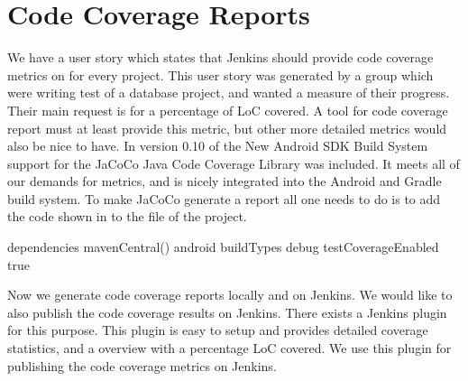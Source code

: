 \section{Code Coverage Reports}

We have a user story which states that Jenkins should provide code coverage metrics on for every project. This user story was generated by a group which were writing test of a database project, and wanted a measure of their progress. Their main request is for a percentage of LoC covered. A tool for code coverage report must at least provide this metric, but other more detailed metrics would also be nice to have. In version 0.10 of the New Android SDK Build System\parencite{new-build-android} support for the JaCoCo\parencite{jacoco-home} Java Code Coverage Library was included. It meets all of our demands for metrics, and is nicely integrated into the Android and Gradle build system. 
To make JaCoCo generate a report all one needs to do is to add the code shown in  to the  file of the project. 
\begin{gradlecode}[caption=Gradle script for enabling JaCoCo,label=lst:Jacoco]
dependencies {
    mavenCentral()
}
android {
    buildTypes {
        debug {
            testCoverageEnabled true
        }
    }
}
\end{gradlecode}{}
Now we generate code coverage reports locally and on Jenkins. We would like to also publish the code coverage results on Jenkins. There exists a Jenkins plugin for this purpose\parencite{jacoco-jenkins-plugin}. This plugin is easy to setup and provides detailed coverage statistics, and a overview with a percentage LoC covered. We use this plugin for publishing the code coverage metrics on Jenkins.